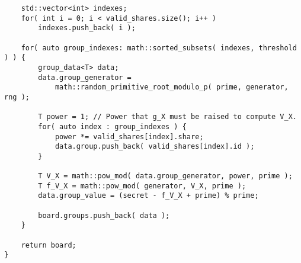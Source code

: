 \documentclass[10pt]{article}
\begin{document}
\begin{verbatim}
    std::vector<int> indexes;
    for( int i = 0; i < valid_shares.size(); i++ )
        indexes.push_back( i );

    for( auto group_indexes: math::sorted_subsets( indexes, threshold ) ) {
        group_data<T> data;
        data.group_generator =
            math::random_primitive_root_modulo_p( prime, generator, rng );

        T power = 1; // Power that g_X must be raised to compute V_X.
        for( auto index : group_indexes ) {
            power *= valid_shares[index].share;
            data.group.push_back( valid_shares[index].id );
        }

        T V_X = math::pow_mod( data.group_generator, power, prime );
        T f_V_X = math::pow_mod( generator, V_X, prime );
        data.group_value = (secret - f_V_X + prime) % prime;

        board.groups.push_back( data );
    }

    return board;
}
\end{verbatim}



\end{document}

